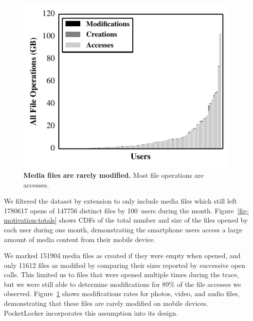 \begin{figure}[t]

\includegraphics{./figures/pocketlocker/OperationPercentageGraph.pdf}

\caption{\small \textbf{Media files are rarely modified.} Most file
operations are accesses.}

\label{fig-motivation-modification}
\vspace*{-0.2in}

\end{figure}

We filtered the dataset by extension to only include media files
which still left \num{1780617} opens of
\num{147756} distinct files by 100~users during the month.
Figure~\ref{fig-motivation-totals} shows CDFs of the total number and size of
the files opened by each \PhoneLab{} user during one month, demonstrating the
smartphone users access a large amount of media content from their mobile
device.

We marked \num{151904} media files as created if they were empty when opened,
and only \num{11612} files as modified by comparing their sizes reported by
successive open calls. This limited us to files that were opened multiple
times during the trace, but we were still able to determine modifications for
89\% of the file accesses we observed.
Figure~\ref{fig-motivation-modification} shows modifications rates for
photos, video, and audio files, demonstrating that these files are rarely
modified on mobile devices. PocketLocker incorporates this assumption into
its design.

